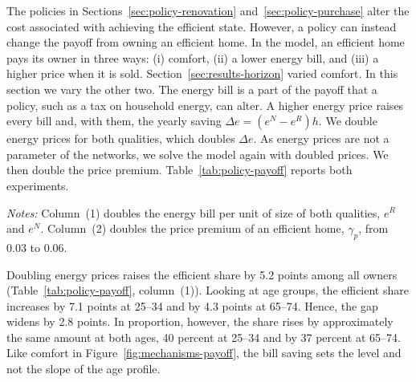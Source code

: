 The policies in Sections~\ref{sec:policy-renovation}
and~\ref{sec:policy-purchase} alter the cost associated with achieving the efficient state. However, a
policy can instead change the payoff from owning an efficient home. In the model, an efficient home pays its owner in
three ways: (i) comfort,  (ii) a lower energy bill, and (iii) a higher price when it
is sold.
Section~\ref{sec:results-horizon} varied comfort. In this section  we vary the
other two. The energy
bill is a part of the payoff that a policy, such as a tax on household
energy, can alter. A higher energy price raises every bill and, with them,
the yearly saving $\Delta e=(e^N-e^R)h$. We double energy prices for both
qualities, which doubles $\Delta e$. As energy prices are not a parameter of
the networks, we solve the model again with doubled prices. We
then double the price premium. Table~\ref{tab:policy-payoff} reports both
experiments.

\begin{table}[t]
  \centering
  \caption[Changing the payoff]{{Changing the payoff}}\label{tab:policy-payoff}
  \begin{threeparttable}
    \small
    \begin{tablenotes}[flushleft]\footnotesize
      \item {\textit{Notes:} Column~(1) doubles the energy bill per
      unit of size of both qualities, $e^R$ and $e^N$. Column~(2) doubles
      the price premium of an efficient home, $\gamma_p$, from 0.03 to 0.06.
      }
    \end{tablenotes}
  \end{threeparttable}
\end{table}

Doubling energy prices raises the efficient share by 5.2 points among all
owners (Table~\ref{tab:policy-payoff}, column~(1)). Looking at age groups, the efficient share increases by 7.1 points at 25--34 and by 4.3 points at 65--74. Hence,  the gap
widens by 2.8 points. In proportion, however, the share rises by approximately
the same amount at both ages,  40 percent at 25--34 and by 37 percent at 65--74.  Like comfort in
Figure~\ref{fig:mechanisms-payoff}, the bill saving sets the level and not the slope of the age profile.



